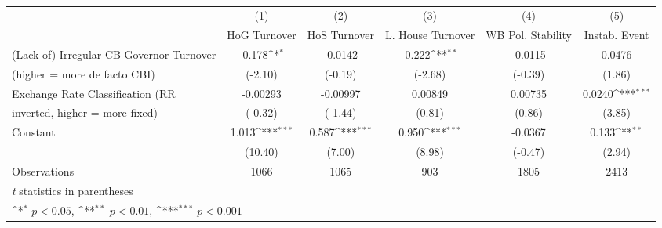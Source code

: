 \begin{table}[htbp]\centering
\def\sym#1{\ifmmode^{#1}\else\(^{#1}\)\fi}
\caption{\label{democraciesFEDF}}
\begin{tabular}{l*{5}{c}}
\toprule
                                        &\multicolumn{1}{c}{(1)}&\multicolumn{1}{c}{(2)}&\multicolumn{1}{c}{(3)}&\multicolumn{1}{c}{(4)}&\multicolumn{1}{c}{(5)}\\
                                        &\multicolumn{1}{c}{HoG Turnover}&\multicolumn{1}{c}{HoS Turnover}&\multicolumn{1}{c}{L. House Turnover}&\multicolumn{1}{c}{WB Pol. Stability}&\multicolumn{1}{c}{Instab. Event}\\
\midrule
(Lack of) Irregular CB Governor Turnover&   -0.178\sym{*}  &  -0.0142         &   -0.222\sym{**} &  -0.0115         &   0.0476         \\
(higher = more de facto CBI)            &  (-2.10)         &  (-0.19)         &  (-2.68)         &  (-0.39)         &   (1.86)         \\
\addlinespace
Exchange Rate Classification (RR        & -0.00293         & -0.00997         &  0.00849         &  0.00735         &   0.0240\sym{***}\\
inverted, higher = more fixed)          &  (-0.32)         &  (-1.44)         &   (0.81)         &   (0.86)         &   (3.85)         \\
\addlinespace
Constant                                &    1.013\sym{***}&    0.587\sym{***}&    0.950\sym{***}&  -0.0367         &    0.133\sym{**} \\
                                        &  (10.40)         &   (7.00)         &   (8.98)         &  (-0.47)         &   (2.94)         \\
\midrule
Observations                            &     1066         &     1065         &      903         &     1805         &     2413         \\
\bottomrule
\multicolumn{6}{l}{\footnotesize \textit{t} statistics in parentheses}\\
\multicolumn{6}{l}{\footnotesize \sym{*} \(p<0.05\), \sym{**} \(p<0.01\), \sym{***} \(p<0.001\)}\\
\end{tabular}
\end{table}

